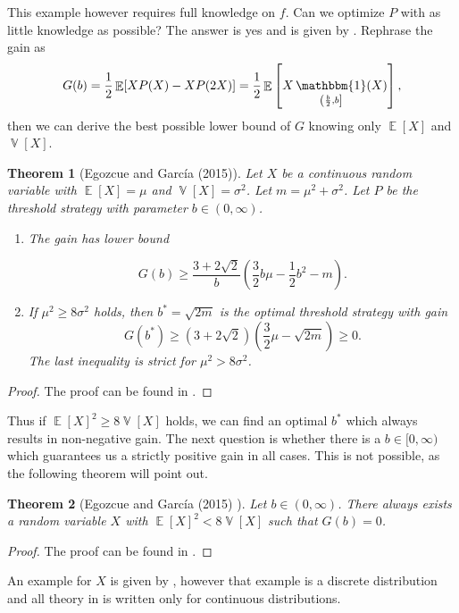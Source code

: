 \documentclass[a4paper]{report}
\theoremstyle{plain}
\newtheorem{theorem}{Theorem}[section]
\theoremstyle{definition}
\theoremstyle{remark}
\numberwithin{equation}{chapter}
\DeclareMathOperator{\V}{\mathbb{V}}
\DeclareMathOperator{\E}{\mathbb{E}}
\DeclareMathOperator{\1}{\mathbbm{1}}
\begin{document}
This example however requires full knowledge on $f$. Can we optimize $P$ with as little knowledge as possible? The answer is yes and is given by \cite{Egozcue15}. Rephrase the gain as
\begin{equation}
G(b)=\frac{1}{2}\E[XP(X)-XP(2X)]=\frac{1}{2}\E\left[X\1_{\left(\frac{b}{2},b\right]}(X)\right],
\end{equation}
then we can derive the best possible lower bound of $G$ knowing only $\E[X]$ and $\V[X]$.
\begin{theorem}[Egozcue and García (2015)]\label{thm:EnvelopeSwitchBound}
Let $X$ be a continuous random variable with $\E[X]=\mu$ and $\V[X]=\sigma^2$. Let $m=\mu^2+\sigma^2$. Let $P$ be the threshold strategy with parameter $b\in(0,\infty)$.
\begin{enumerate}
    \item The gain has lower bound

       \begin{equation}
    G(b)\geq\frac{3+2\sqrt{2}}{b}\left(\frac{3}{2}b\mu-\frac{1}{2}b^2-m\right).
    \end{equation}
    \item If $\mu^2\geq 8\sigma^2$ holds, then $b^*=\sqrt{2m}$ is the optimal threshold strategy with gain
        \begin{equation}
    G(b^*)\geq(3+2\sqrt{2})\left(\frac{3}{2}\mu-\sqrt{2m}\right)\geq0.
    \end{equation}
    The last inequality is strict for $\mu^2>8\sigma^2$.
\end{enumerate}
\end{theorem}
\begin{proof}
The proof can be found in \cite{Egozcue15}.
\end{proof}
Thus if $\E[X]^2\geq8\V[X]$ holds, we can find an optimal $b^*$ which always results in non-negative gain. The next question is whether there is a $b\in[0,\infty)$ which guarantees us a strictly positive gain in all cases. This is not possible, as the following theorem will point out.
\begin{theorem}[Egozcue and García (2015) \cite{Egozcue15}]
Let $b\in(0,\infty)$. There always exists a random variable $X$ with $\E[X]^2<8\V[X]$ such that $G(b)=0$.
\end{theorem}
\begin{proof}
The proof can be found in \cite{Egozcue15}.
\end{proof}
An example for $X$ is given by \cite{Egozcue15}, however that example is a discrete distribution and all theory in \cite{Egozcue15,McDonnell09,McDonnell11} is written only for continuous distributions.
\end{document}
